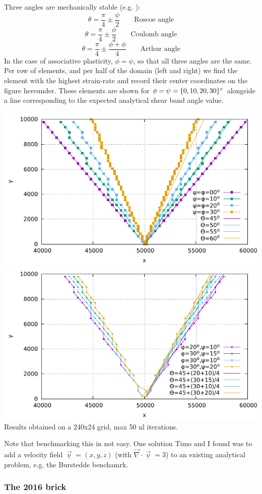 Three angles are mechanically stable (e.g. \cite{kaus10}):
\[
\theta=\frac{\pi}{4}\pm \frac{\psi}{2} \qquad \text{Roscoe angle}
\]
\[
\theta=\frac{\pi}{4}\pm \frac{\phi}{2} \qquad \text{Coulomb angle}
\]
\[
\theta=\frac{\pi}{4}\pm \frac{\phi+\phi}{4} \qquad \text{Arthur angle}
\]
In the case of associative plasticity, $\phi=\psi$, so that all three angles are the same. 
Per row of elements, and per half of the domain (left and right) we find the element
with the highest strain-rate and record their center coordinates on the figure hereunder. 
These elements are shown for $\phi=\psi=\{0,10,20,30\}\degree$ alongside a line corresponding to 
the expected analytical shear band angle value.
\begin{center}
\includegraphics[width=.6\linewidth]{python_codes/fieldstone_39/images/shear_bands}\\
\includegraphics[width=.6\linewidth]{python_codes/fieldstone_39/images/shear_bands_nonass}\\
Results obtained on a 240x24 grid, max 50 nl iterations.
\end{center}



Note that benchmarking this in not easy. One solution Timo and I found was to add a 
velocity field $\underline{\vec\upnu}=(x,y,z)$ (with $\vec\nabla\cdot\underline{\vec\upnu}=3$)
to an existing analytical problem, e.g. the Burstedde benchamrk.

\subsubsection{The 2016 brick}

